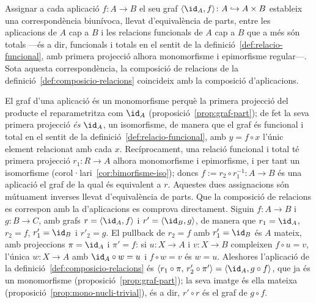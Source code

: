 \begin{proposicio}\label{prop:aplicacio-funcional}
Assignar a cada aplicació \(f\colon A\to B\) el seu graf
\(\langle\id_A,f\rangle\colon A\hookrightarrow A\times B\) estableix una
correspondència biunívoca, llevat d'equivalència de parts, entre les
aplicacions de \(A\) cap a \(B\) i les relacions funcionals de \(A\) cap a
\(B\) que a més són totals ---és a dir, funcionals i totals en el sentit
de la definició~\ref{def:relacio-funcional}, amb primera projecció alhora
monomorfisme i epimorfisme regular---.
Sota aquesta correspondència, la composició de relacions de la
definició~\ref{def:composicio-relacions} coincideix amb la composició
d'aplicacions.
\end{proposicio}

\begin{prova}
El graf d'una aplicació és un monomorfisme perquè la primera projecció
del producte el reparametritza com \(\id_A\)
(proposició~\ref{prop:graf-part}); de fet la seva primera projecció
\emph{és} \(\id_A\), un isomorfisme, de manera que el graf és funcional i
total en el sentit de la definició~\ref{def:relacio-funcional}, amb
\(y=f\circ x\) l'únic element relacionat amb cada \(x\).
Recíprocament, una relació funcional i total té primera projecció
\(r_1\colon R\to A\) alhora monomorfisme i epimorfisme, i per tant un
isomorfisme (corol·lari~\ref{cor:bimorfisme-iso}); doncs
\(f:=r_2\circ r_1^{-1}\colon A\to B\) és una aplicació el graf de la qual
és equivalent a \(r\). Aquestes dues assignacions són mútuament inverses
llevat d'equivalència de parts. Que la composició de relacions es
correspon amb la d'aplicacions es comprova directament. Siguin
\(f\colon A\to B\) i \(g\colon B\to C\), amb grafs
\(r=\langle\id_A,f\rangle\) i \(r'=\langle\id_B,g\rangle\), de manera que
\(r_1=\id_A\), \(r_2=f\), \(r'_1=\id_B\) i \(r'_2=g\). El pullback de
\(r_2=f\) amb \(r'_1=\id_B\) és \(A\) mateix, amb projeccions
\(\pi=\id_A\) i \(\pi'=f\): si \(u\colon X\to A\) i \(v\colon X\to B\)
compleixen \(f\circ u=v\), l'única \(w\colon X\to A\) amb \(\id_A\circ
w=u\) i \(f\circ w=v\) és \(w=u\). Aleshores l'aplicació de la
definició~\ref{def:composicio-relacions} és
\(\langle r_1\circ\pi,\,r'_2\circ\pi'\rangle=\langle\id_A,g\circ f\rangle\),
que ja és un monomorfisme (proposició~\ref{prop:graf-part}); la seva
imatge és ella mateixa (proposició~\ref{prop:mono-nucli-trivial}), és a
dir, \(r'\circ r\) és el graf de \(g\circ f\).
\end{prova}

